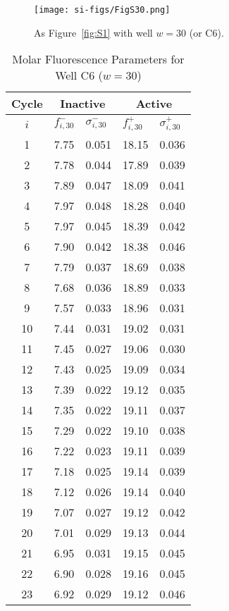                 \begin{figure}
                    \centering
                    \texttt{[image: si-figs/FigS30.png]}
                    \caption{
                        As Figure~\ref{fig:S1} with well $w=30$ (or C6).
                    }
                \end{figure}
                \clearpage
    \begin{table}
        \caption{Molar Fluorescence Parameters for Well C6 ($w=30$)}
        \centering
        \begin{tabular}{c|ll|ll}
            Cycle & \multicolumn{2}{c|}{Inactive} & \multicolumn{2}{c}{Active} \\
            \hline
            $i$ & $f_{i,30}^{-}$ & $\sigma_{i,30}^{-}$ &  $f_{i,30}^{+}$ & $\sigma_{i,30}^{+}$ \\
            \hline
    1 & 7.75 & 0.051 & 18.15 & 0.036 \\
2 & 7.78 & 0.044 & 17.89 & 0.039 \\
3 & 7.89 & 0.047 & 18.09 & 0.041 \\
4 & 7.97 & 0.048 & 18.28 & 0.040 \\
5 & 7.97 & 0.045 & 18.39 & 0.042 \\
6 & 7.90 & 0.042 & 18.38 & 0.046 \\
7 & 7.79 & 0.037 & 18.69 & 0.038 \\
8 & 7.68 & 0.036 & 18.89 & 0.033 \\
9 & 7.57 & 0.033 & 18.96 & 0.031 \\
10 & 7.44 & 0.031 & 19.02 & 0.031 \\
11 & 7.45 & 0.027 & 19.06 & 0.030 \\
12 & 7.43 & 0.025 & 19.09 & 0.034 \\
13 & 7.39 & 0.022 & 19.12 & 0.035 \\
14 & 7.35 & 0.022 & 19.11 & 0.037 \\
15 & 7.29 & 0.022 & 19.10 & 0.038 \\
16 & 7.22 & 0.023 & 19.11 & 0.039 \\
17 & 7.18 & 0.025 & 19.14 & 0.039 \\
18 & 7.12 & 0.026 & 19.14 & 0.040 \\
19 & 7.07 & 0.027 & 19.12 & 0.042 \\
20 & 7.01 & 0.029 & 19.13 & 0.044 \\
21 & 6.95 & 0.031 & 19.15 & 0.045 \\
22 & 6.90 & 0.028 & 19.16 & 0.045 \\
23 & 6.92 & 0.029 & 19.12 & 0.046 \\

\end{tabular}
\end{table}

